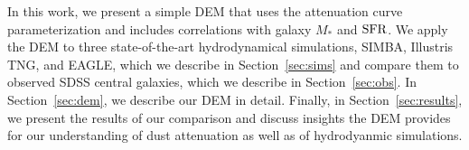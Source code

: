 In this work, we present a simple DEM that uses the \cite{noll2009}
attenuation curve parameterization and includes correlations with galaxy $M_*$
and ${\rm SFR}$. We apply the DEM to three state-of-the-art hydrodynamical
simulations, SIMBA, Illustris TNG, and EAGLE, which we describe in
Section~\ref{sec:sims} and compare them to observed SDSS central galaxies,
which we describe in Section~\ref{sec:obs}. In Section~\ref{sec:dem}, we
describe our DEM in detail. Finally, in Section~\ref{sec:results}, we present
the results of our comparison and discuss insights the DEM provides for our
understanding of dust attenuation as well as of hydrodyanmic simulations. 

